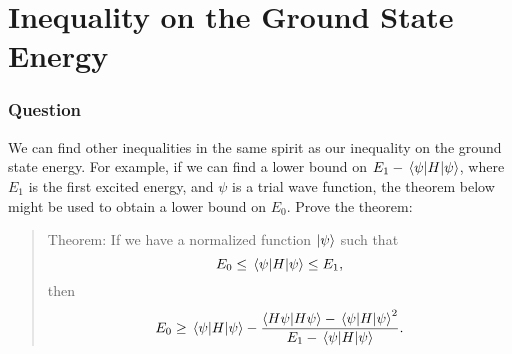 \documentclass{article}[16pt]
\begin{document}
\section{Inequality on the Ground State Energy}
\subsubsection{Question}
We can find other inequalities in the same spirit as our inequality on the ground state energy. For example, if we can find a lower bound on $E_1 - \expval{H}{\psi}$, where $E_1$ is the first excited energy, and $\psi$ is a trial wave function, the theorem below might be used to obtain a lower bound on $E_0$. Prove the theorem:
\begin{quote}
    Theorem: If we have a normalized function $\ket{\psi}$ such that
    \[ E_0 \leq \expval{H}{\psi} \leq E_1, \]
    then
    \[ E_0 \geq \expval{H}{\psi} - \frac{\bra{H\psi  }\ket{H\psi  } - \expval{H}{\psi}^2}{E_1 - \expval{H}{\psi}}. \]
\end{quote}
\end{document}
